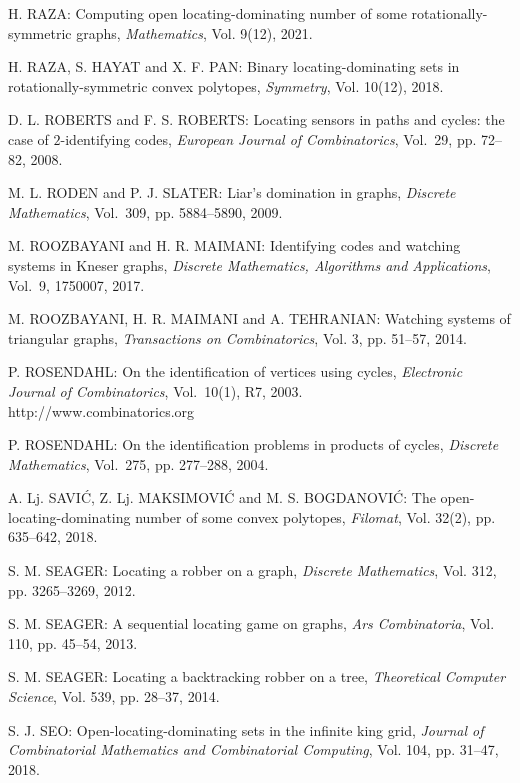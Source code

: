 \begin{thebibliography}{999}
H. RAZA: Computing open locating-dominating number of some rotationally-symmetric graphs, {\it Mathematics},  Vol. 9(12), 2021.

H. RAZA, S. HAYAT and X. F. PAN: Binary locating-dominating sets in rotationally-symmetric convex polytopes, {\it Symmetry},  Vol. 10(12), 2018.

D. L. ROBERTS and F. S. ROBERTS: Locating sensors in paths and cycles: the case of $2$-identifying codes, {\it European Journal of Combinatorics}, Vol.~29, pp. 72--82, 2008.

M. L. RODEN and P. J. SLATER: Liar's domination in graphs, {\it Discrete Mathematics}, Vol.~309, pp. 5884--5890, 2009.

M. ROOZBAYANI and H. R. MAIMANI: Identifying codes and watching systems in Kneser graphs, {\it Discrete Mathematics, Algorithms and Applications}, Vol.~9, 1750007, 2017.

M. ROOZBAYANI, H. R. MAIMANI and A. TEHRANIAN: Watching systems of triangular graphs, {\it Transactions on Combinatorics}, Vol. 3, pp. 51--57, 2014.

P. ROSENDAHL: On the identification of vertices using cycles, {\it Electronic Journal of Combinatorics}, Vol.~10(1), R7, 2003.\\
http://www.combinatorics.org

P. ROSENDAHL: On the identification problems in products of cycles, {\it Discrete Mathematics}, Vol.~275, pp. 277--288, 2004.

A. Lj. SAVI\'C, Z. Lj. MAKSIMOVI\'C and M. S. BOGDANOVI\'C: The open-locating-dominating number of some convex polytopes, {\it Filomat}, Vol. 32(2), pp. 635--642, 2018.

S. M. SEAGER: Locating a robber on a graph, {\it Discrete Mathematics}, Vol. 312, pp. 3265--3269, 2012.

S. M. SEAGER: A sequential locating game on graphs, {\it Ars Combinatoria}, Vol. 110, pp. 45--54, 2013.

S. M. SEAGER: Locating a backtracking robber on a tree, {\it Theoretical Computer Science}, Vol. 539, pp. 28--37, 2014.

S. J. SEO: Open-locating-dominating sets in the infinite king grid, {\it Journal of Combinatorial Mathematics and Combinatorial Computing}, Vol. 104, pp. 31--47, 2018.


\end{thebibliography}
